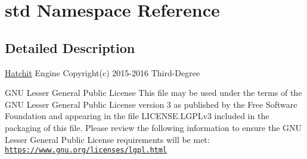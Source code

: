 \hypertarget{namespacestd}{}\section{std Namespace Reference}
\label{namespacestd}


\subsection{Detailed Description}
\hyperlink{namespaceHatchit}{Hatchit} Engine Copyright(c) 2015-\/2016 Third-\/\+Degree

G\+NU Lesser General Public License This file may be used under the terms of the G\+NU Lesser General Public License version 3 as published by the Free Software Foundation and appearing in the file L\+I\+C\+E\+N\+S\+E.\+L\+G\+P\+Lv3 included in the packaging of this file. Please review the following information to ensure the G\+NU Lesser General Public License requirements will be met\+: \href{https://www.gnu.org/licenses/lgpl.html}{\tt https\+://www.\+gnu.\+org/licenses/lgpl.\+html} 